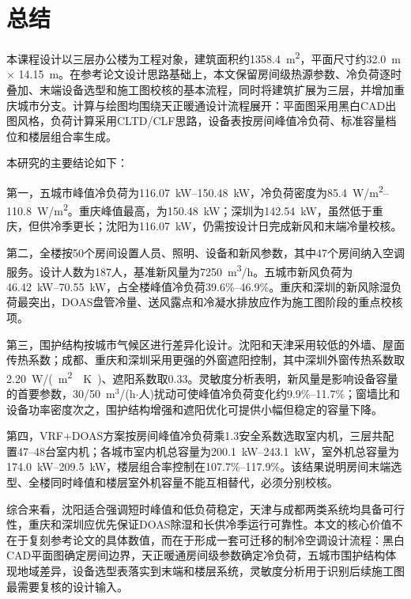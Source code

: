 \section{总结}

本课程设计以三层办公楼为工程对象，建筑面积约\SI{1358.4}{m^2}，平面尺寸约\SI{32.0}{m} $\times$ \SI{14.15}{m}。在参考论文设计思路基础上，本文保留房间级热源参数、冷负荷逐时叠加、末端设备选型和施工图校核的基本流程，同时将建筑扩展为三层，并增加重庆城市分支。计算与绘图均围绕天正暖通设计流程展开：平面图采用黑白CAD出图风格，负荷计算采用CLTD/CLF思路，设备表按房间峰值冷负荷、标准容量档位和楼层组合率生成。

本研究的主要结论如下：

第一，五城市峰值冷负荷为\SI{116.07}{kW}--\SI{150.48}{kW}，冷负荷密度为\SI{85.4}{W/m^2}--\SI{110.8}{W/m^2}。重庆峰值最高，为\SI{150.48}{kW}；深圳为\SI{142.54}{kW}，虽然低于重庆，但供冷季更长；沈阳为\SI{116.07}{kW}，仍需按设计日完成新风和末端冷量校核。

第二，全楼按50个房间设置人员、照明、设备和新风参数，其中47个房间纳入空调服务。设计人数为187人，基准新风量为\SI{7250}{m^3/h}。五城市新风负荷为\SI{46.42}{kW}--\SI{70.55}{kW}，占全楼峰值冷负荷39.6\%--46.9\%。重庆和深圳的新风除湿负荷最突出，DOAS盘管冷量、送风露点和冷凝水排放应作为施工图阶段的重点校核项。

第三，围护结构按城市气候区进行差异化设计。沈阳和天津采用较低的外墙、屋面传热系数；成都、重庆和深圳采用更强的外窗遮阳控制，其中深圳外窗传热系数取\SI{2.20}{W/(m^2\cdot K)}、遮阳系数取0.33。灵敏度分析表明，新风量是影响设备容量的首要参数，30/50~m$^3$/(h$\cdot$人)扰动可使峰值冷负荷变化约9.9\%--11.7\%；窗墙比和设备功率密度次之，围护结构增强和遮阳优化可提供小幅但稳定的容量下降。

第四，VRF+DOAS方案按房间峰值冷负荷乘1.3安全系数选取室内机，三层共配置47--48台室内机；各城市室内机总容量为\SI{200.1}{kW}--\SI{243.1}{kW}，室外机总容量为\SI{174.0}{kW}--\SI{209.5}{kW}，楼层组合率控制在107.7\%--117.9\%。该结果说明房间末端选型、全楼同时峰值和楼层室外机容量不能互相替代，必须分别校核。

综合来看，沈阳适合强调短时峰值和低负荷稳定，天津与成都两类系统均具备可行性，重庆和深圳应优先保证DOAS除湿和长供冷季运行可靠性。本文的核心价值不在于复刻参考论文的具体数值，而在于形成一套可迁移的制冷空调设计流程：黑白CAD平面图确定房间边界，天正暖通房间级参数确定冷负荷，五城市围护结构体现地域差异，设备选型表落实到末端和楼层系统，灵敏度分析用于识别后续施工图最需要复核的设计输入。
